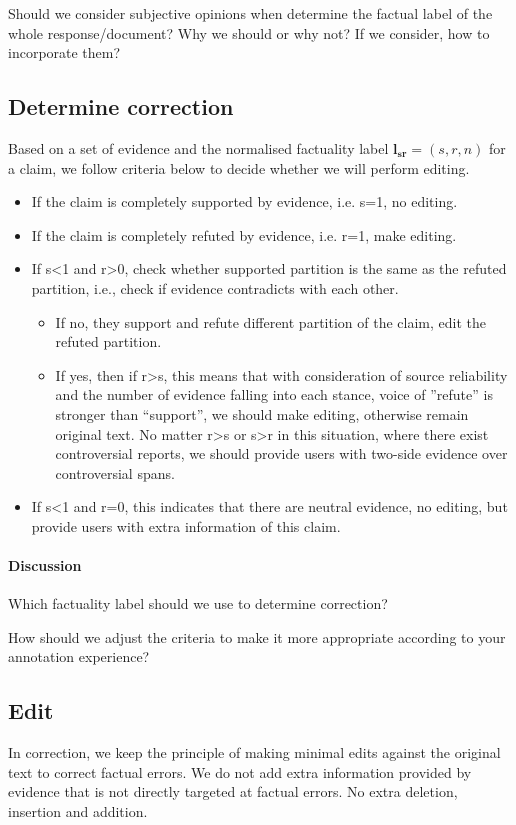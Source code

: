 \documentclass[11pt]{article}
\begin{document}
Should we consider subjective opinions when determine the factual label of the whole response/document?
Why we should or why not?
If we consider, how to incorporate them? 

\subsection{Determine correction}
Based on a set of evidence and the normalised factuality label $\mathbf{l_{sr}}=(s, r, n)$ for a claim, we follow criteria below to decide whether we will perform editing.
\begin{itemize}
    \item If the claim is completely supported by evidence, i.e. s=1, no editing.
    \item If the claim is completely refuted by evidence, i.e. r=1, make editing.
    \item If s<1 and r>0, check whether supported partition is the same as the refuted partition, i.e., check if evidence contradicts with each other.
    \begin{itemize}
        \item If no, they support and refute different partition of the claim, edit the refuted partition.
        \item If yes, then if r>s, this means that with consideration of source reliability and the number of evidence falling into each stance, voice of ''refute'' is stronger than ``support'', we should make editing, otherwise remain original text.
        No matter r>s or s>r in this situation, where there exist controversial reports, we should provide users with two-side evidence over controversial spans.
    \end{itemize}
    \item If s<1 and r=0, this indicates that there are neutral evidence, no editing, but provide users with extra information of this claim.
\end{itemize}
\paragraph{Discussion}
Which factuality label should we use to determine correction?

How should we adjust the criteria to make it more appropriate according to your annotation experience?



\subsection{Edit}
In correction, we keep the principle of making minimal edits against the original text to correct factual errors. 
We do not add extra information provided by evidence that is not directly targeted at factual errors.
No extra deletion, insertion and addition.
\end{document}
